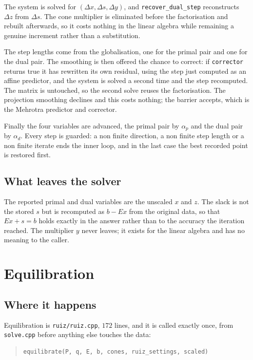 \documentclass[a4paper,11pt]{book}
\theoremstyle{plain}
\theoremstyle{definition}
\theoremstyle{remark}
\numberwithin{equation}{chapter}
\numberwithin{algorithm}{chapter}
\begin{document}
	The system is solved for $(\Delta x,\Delta s,\Delta y)$, and
	\texttt{recover\_dual\_step} reconstructs $\Delta z$ from $\Delta s$. The cone
	multiplier is eliminated before the factorisation and rebuilt afterwards, so
	it costs nothing in the linear algebra while remaining a genuine increment
	rather than a substitution.

	The step lengths come from the globalisation, one for the primal pair and one
	for the dual pair. The smoothing is then offered the chance to correct: if
	\texttt{corrector} returns true it has rewritten its own residual, using the
	step just computed as an affine predictor, and the system is solved a second
	time and the step recomputed. The matrix is untouched, so the second solve
	reuses the factorisation. The projection smoothing declines and this costs
	nothing; the barrier accepts, which is the Mehrotra predictor and corrector.

	Finally the four variables are advanced, the primal pair by $\alpha_p$ and the
	dual pair by $\alpha_d$. Every step is guarded: a non finite direction, a non
	finite step length or a non finite iterate ends the inner loop, and in the
	last case the best recorded point is restored first.

	\section{What leaves the solver}

	The reported primal and dual variables are the unscaled $x$ and $z$. The slack
	is not the stored $s$ but is recomputed as $b-Ex$ from the original data, so
	that $Ex+s=b$ holds exactly in the answer rather than to the accuracy the
	iteration reached. The multiplier $y$ never leaves; it exists for the linear
	algebra and has no meaning to the caller.

	\chapter{Equilibration}

	\section{Where it happens}

	Equilibration is \texttt{ruiz/ruiz.cpp}, $172$ lines, and it is called
	exactly once, from \texttt{solve.cpp} before anything else touches the data:

	\begin{quote}
		\texttt{equilibrate(P, q, E, b, cones, ruiz\_settings, scaled)}
	\end{quote}
\end{document}
